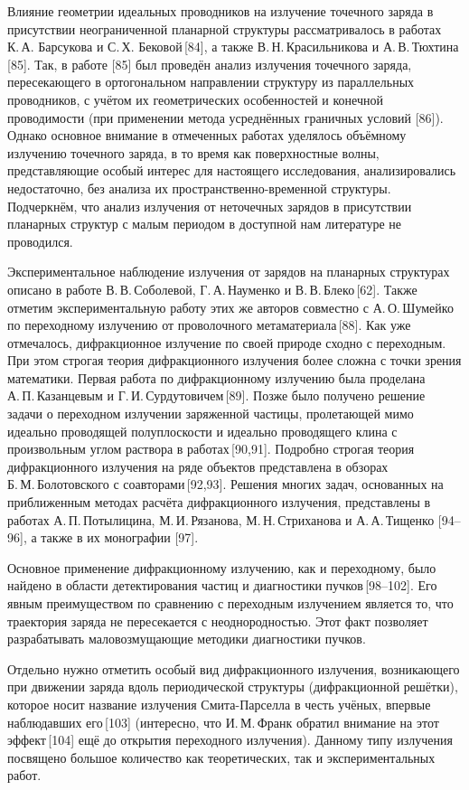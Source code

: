 Влияние геометрии идеальных проводников на излучение точечного заряда в присутствии неограниченной планарной структуры рассматривалось в работах К. А. Барсукова и С. Х. Бековой [84], а также В. Н. Красильникова и А. В. Тюхтина [85]. Так, в работе [85] был проведён анализ излучения точечного заряда, пересекающего в ортогональном направлении структуру из параллельных проводников, с учётом их геометрических особенностей и конечной проводимости (при применении метода усреднённых граничных условий [86]). Однако основное внимание в отмеченных работах уделялось объёмному излучению точечного заряда, в то время как поверхностные волны, представляющие особый интерес для настоящего исследования, анализировались недостаточно, без анализа их пространственно-временной структуры. Подчеркнём, что анализ излучения от неточечных зарядов в присутствии планарных структур с малым периодом в доступной нам литературе не проводился.

Экспериментальное наблюдение излучения от зарядов на планарных структурах описано в работе В. В. Соболевой, Г. А. Науменко и В. В. Блеко [62]. Также отметим экспериментальную работу этих же авторов совместно с А. О. Шумейко по переходному излучению от проволочного метаматериала [88].
Как уже отмечалось, дифракционное излучение по своей природе сходно с переходным. При этом строгая теория дифракционного излучения более сложна с точки зрения математики. Первая работа по дифракционному излучению была проделана А. П. Казанцевым и Г. И. Сурдутовичем [89]. Позже было получено решение задачи о переходном излучении заряженной частицы, пролетающей мимо идеально проводящей полуплоскости и идеально проводящего клина с произвольным углом раствора в работах [90,91]. Подробно строгая теория дифракционного излучения на ряде объектов представлена в обзорах Б. М. Болотовского с соавторами [92,93]. Решения многих задач, основанных на приближенным методах расчёта дифракционного излучения, представлены в работах А. П. Потылицина, М. И. Рязанова, М. Н. Стриханова и А. А. Тищенко [94–96], а также в их монографии [97].

Основное применение дифракционному излучению, как и переходному, было найдено в области детектирования частиц и диагностики пучков [98–102]. Его явным преимуществом по сравнению с переходным излучением является то, что траектория заряда не пересекается с неоднородностью. Этот факт позволяет разрабатывать маловозмущающие методики диагностики пучков.

Отдельно нужно отметить особый вид дифракционного излучения, возникающего при движении заряда вдоль периодической структуры (дифракционной решётки), которое носит название излучения Смита-Парселла в честь учёных, впервые наблюдавших его [103] (интересно, что И. М. Франк обратил внимание на этот эффект [104] ещё до открытия переходного излучения). Данному типу излучения посвящено большое количество как теоретических, так и экспериментальных работ.

